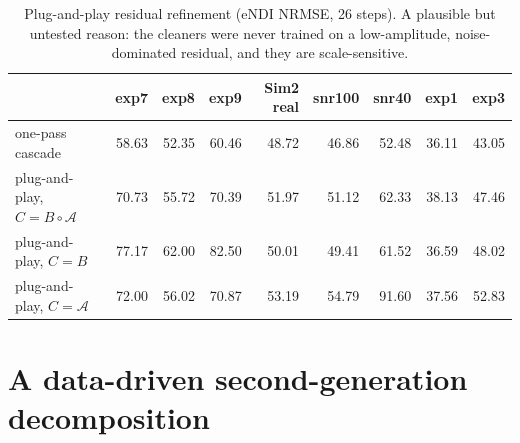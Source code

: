 \documentclass[11pt]{article}
\begin{document}
\begin{table}[h]\centering\small
\begin{tabular}{@{}lrrrrrrrr@{}}
\toprule
 & exp7 & exp8 & exp9 & Sim2 real & snr100 & snr40 & exp1 & exp3 \\
\midrule
one-pass cascade & 58.63 & 52.35 & 60.46 & 48.72 & 46.86 & 52.48 & 36.11 & 43.05 \\
plug-and-play, $C=B\circ\mathcal A$ & 70.73 & 55.72 & 70.39 & 51.97 & 51.12 & 62.33 & 38.13 & 47.46 \\
plug-and-play, $C=B$ & 77.17 & 62.00 & 82.50 & 50.01 & 49.41 & 61.52 & 36.59 & 48.02 \\
plug-and-play, $C=\mathcal A$ & 72.00 & 56.02 & 70.87 & 53.19 & 54.79 & 91.60 & 37.56 & 52.83 \\
\bottomrule
\end{tabular}
\caption{Plug-and-play residual refinement (eNDI NRMSE, 26 steps). A plausible but untested reason: the cleaners were never trained on a low-amplitude, noise-dominated residual, and they are scale-sensitive.}\label{tab:pnp}
\end{table}

\section{A data-driven second-generation decomposition}\label{sec:design}
\end{document}
